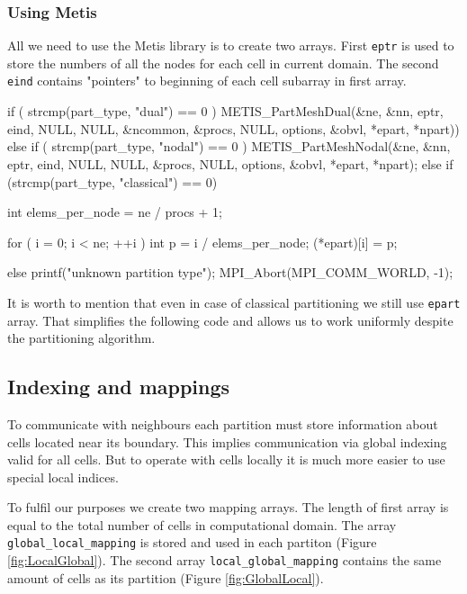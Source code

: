 \documentclass[12pt, a4paper]{article}
\begin{document}

\subsubsection{Using Metis}

All we need to use the Metis library is to create two arrays.
First \texttt{eptr} is used to store the numbers of all the nodes for each cell in current domain.
The second \texttt{eind} contains "pointers" to beginning of each cell subarray in first array.

\begin{cpp}
if ( strcmp(part_type, "dual") == 0 ) {
    METIS_PartMeshDual(&ne, &nn,
                       eptr, eind,
                       NULL, NULL, &ncommon,
                       &procs, NULL, options,
                       &obvl, *epart, *npart))
} else if ( strcmp(part_type, "nodal") == 0 ) {
    METIS_PartMeshNodal(&ne, &nn,
                        eptr, eind,
                        NULL, NULL,
                        &procs,
                        NULL, options,
                        &obvl, *epart, 
                        *npart);
} else if (strcmp(part_type, "classical") == 0) {
    int elems_per_node = ne / procs + 1;

    for ( i = 0; i < ne; ++i ) {
        int p = i / elems_per_node;
        (*epart)[i] = p;
    }
} else {
    printf("unknown partition type\n");
    MPI_Abort(MPI_COMM_WORLD, -1);
}
\end{cpp}

It is worth to mention that even in case of classical partitioning we still use \texttt{epart}
array. That simplifies the following code and allows us to work
uniformly despite the partitioning algorithm.



\subsection{Indexing and mappings}

To communicate with neighbours each partition must store information about
cells located near its boundary.
This implies communication via global indexing valid for all cells.
But to operate with cells locally it is much more easier to use
special local indices.

To fulfil our purposes we create two mapping arrays. The length of first array
is equal to the total number of cells in computational domain.
The array \texttt{global\_local\_mapping} is stored and used 
in each partiton (Figure \ref{fig:LocalGlobal}).
The second array \texttt{local\_global\_mapping} contains the same amount of cells
as its partition (Figure \ref{fig:GlobalLocal}).
\end{document}
